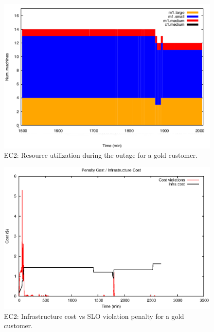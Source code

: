 \begin{figure}
  \begin{center}
    \includegraphics[width=.85\linewidth]{images/exps2011/high/ec2/inst_type_machines_filtered.pdf}
  \end{center}
\vspace{-5mm}
  \caption{EC2: Resource utilization during the outage for a gold customer.}
  \label{resOutage}
\end{figure}

\begin{figure}
  \begin{center}
    \includegraphics[width=.85\linewidth]{images/exps2011/high/ec2/penaltyVScost.eps}
  \end{center}
\vspace{-5mm}
  \caption{EC2: Infrastructure cost vs SLO violation penalty for a gold customer.}
  \label{highPenalty}
\end{figure}

